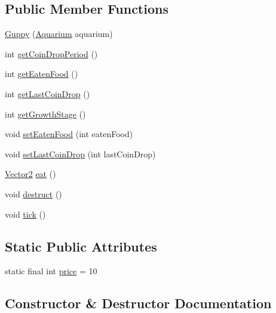 \subsection*{Public Member Functions}
\begin{DoxyCompactItemize}
\item 
\mbox{\hyperlink{class_guppy_a0fd171814071476be9590c38f60a0c52}{Guppy}} (\mbox{\hyperlink{class_aquarium}{Aquarium}} aquarium)
\item 
int \mbox{\hyperlink{class_guppy_ac34adfb8d8a864549629ccb5ebd3ec9a}{get\+Coin\+Drop\+Period}} ()
\item 
int \mbox{\hyperlink{class_guppy_a746ba5508dd9c3413930531de72d13ad}{get\+Eaten\+Food}} ()
\item 
int \mbox{\hyperlink{class_guppy_a37a9561b9fdc8dd53031d322b7e73872}{get\+Last\+Coin\+Drop}} ()
\item 
int \mbox{\hyperlink{class_guppy_adb7ebe1e642a9aa30e31821343982a4b}{get\+Growth\+Stage}} ()
\item 
void \mbox{\hyperlink{class_guppy_a7d7e13e9ae11547a1c41f7c67d228a5b}{set\+Eaten\+Food}} (int eaten\+Food)
\item 
void \mbox{\hyperlink{class_guppy_ad5eb8182fde38ea341af788041f21918}{set\+Last\+Coin\+Drop}} (int last\+Coin\+Drop)
\item 
\mbox{\hyperlink{class_vector2}{Vector2}} \mbox{\hyperlink{class_guppy_a3fdade6bb3cb79b691b5948e522aea8f}{eat}} ()
\item 
void \mbox{\hyperlink{class_guppy_a023ab91782b173342f367b318f642761}{destruct}} ()
\item 
void \mbox{\hyperlink{class_guppy_a9533589560539acbdfbccc32bd6a66b3}{tick}} ()
\end{DoxyCompactItemize}
\subsection*{Static Public Attributes}
\begin{DoxyCompactItemize}
\item 
static final int \mbox{\hyperlink{class_guppy_a711b1ce05b2a4e55af2bbab10876a56d}{price}} = 10
\end{DoxyCompactItemize}


\subsection{Constructor \& Destructor Documentation}
\mbox{\label{class_guppy_a0fd171814071476be9590c38f60a0c52}} 
